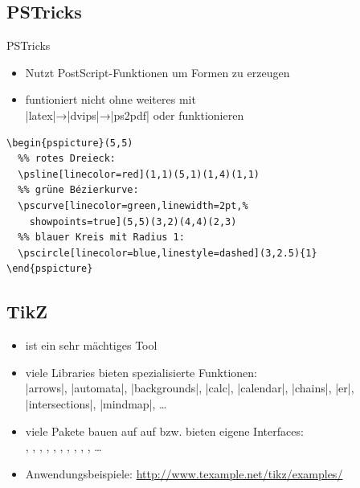 \documentclass[
	vorläufig=true,
	datum=2017-11-24,
	titel={Grafiken, Abbildungen, TikZ},
	web=true,
	mo,
]{../tex/latexkurs-slides}
\begin{document}
\subsection{PSTricks}
\begin{frame}[fragile]{PSTricks}
	\begin{itemize}
		\item Nutzt PostScript-Funktionen um Formen zu erzeugen
		\item funtioniert nicht ohne weiteres mit \\
		|latex|→|dvips|→|ps2pdf| oder  funktionieren
	\end{itemize}
\begin{lstlisting}
\begin{pspicture}(5,5)
  %% rotes Dreieck:
  \psline[linecolor=red](1,1)(5,1)(1,4)(1,1)
  %% grüne Bézierkurve:
  \pscurve[linecolor=green,linewidth=2pt,%
    showpoints=true](5,5)(3,2)(4,4)(2,3)
  %% blauer Kreis mit Radius 1:
  \pscircle[linecolor=blue,linestyle=dashed](3,2.5){1}
\end{pspicture}
\end{lstlisting}
\end{frame}


\subsection{TikZ}
\begin{frame}[t]{\TikZ}
	\begin{itemize}
		\item \TikZ ist ein sehr mächtiges Tool
		\item viele Libraries bieten spezialisierte Funktionen:\\
		|arrows|, |automata|, |backgrounds|, |calc|, |calendar|, |chains|, |er|, |intersections|, |mindmap|, …  
		\item viele Pakete bauen auf \TikZ auf bzw. bieten eigene Interfaces:\\
		, , , , , , , , , , …
		\item Anwendungsbeispiele: \url{http://www.texample.net/tikz/examples/}
	\end{itemize}
\end{frame}
\end{document}

